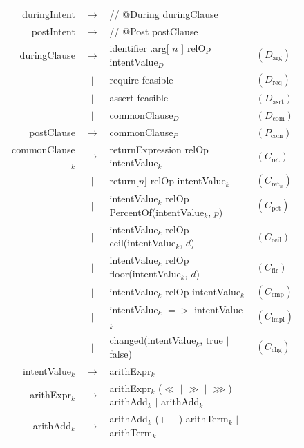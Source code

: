 \documentclass[pdflatex,sn-basic]{sn-jnl}%
\theoremstyle{thmstyleone}%
\theoremstyle{thmstyletwo}%
\theoremstyle{thmstylethree}%
\begin{document}
\begin{figure}[t]
\small
\begin{tabular}{@{}r@{\quad}c@{\quad}l@{\qquad}l@{}}

duringIntent
  & $\rightarrow$ & // @During duringClause & \\[2pt]

postIntent
  & $\rightarrow$ & // @Post postClause & \\[6pt]

duringClause
  & $\rightarrow$ & identifier .arg[ $n$ ] relOp intentValue$_D$
  & $(D_{\text{arg}})$ \\
  & $|$ & require feasible
  & $(D_{\text{req}})$ \\
  & $|$ & assert feasible
  & $(D_{\text{asrt}})$ \\
  & $|$ & commonClause$_D$
  & $(D_{\text{com}})$ \\[6pt]

postClause
  & $\rightarrow$ & commonClause$_P$
  & $(P_{\text{com}})$ \\[6pt]

commonClause$_k$
  & $\rightarrow$ & returnExpression relOp intentValue$_k$
  & $(C_{\text{ret}})$ \\
  & $|$ & return[$n$] relOp intentValue$_k$
  & $(C_{\text{ret}_n})$ \\
  & $|$ & intentValue$_k$ relOp PercentOf(intentValue$_k$, $p$)
  & $(C_{\text{pct}})$ \\
  & $|$ & intentValue$_k$ relOp ceil(intentValue$_k$, $d$)
  & $(C_{\text{ceil}})$ \\
  & $|$ & intentValue$_k$ relOp floor(intentValue$_k$, $d$)
  & $(C_{\text{flr}})$ \\
  & $|$ & intentValue$_k$ relOp intentValue$_k$
  & $(C_{\text{cmp}})$ \\
  & $|$ & intentValue$_k$ ${=}{>}$ intentValue$_k$
  & $(C_{\text{impl}})$ \\
  & $|$ & changed(intentValue$_k$, true $|$ false)
  & $(C_{\text{chg}})$ \\[6pt]

intentValue$_k$
  & $\rightarrow$ & arithExpr$_k$ & \\[2pt]

arithExpr$_k$
  & $\rightarrow$ &
    arithExpr$_k$ ($\ll$ $|$ $\gg$ $|$ $\ggg$) arithAdd$_k$
    $|$ arithAdd$_k$ & \\

arithAdd$_k$
  & $\rightarrow$ &
    arithAdd$_k$ (+ $|$ -) arithTerm$_k$
    $|$ arithTerm$_k$ & \\


\end{tabular}
\end{figure}
\end{document}
